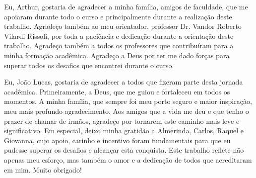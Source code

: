 \begin{agradecimentos}

    Eu, Arthur, gostaria de agradecer a minha família, amigos de faculdade, que me apoiaram durante todo o curso e principalmente durante a realização deste trabalho. Agradeço também ao meu orientador, professor Dr. Vandor Roberto Vilardi Rissoli, por toda a paciência e dedicação durante a orientação deste trabalho. Agradeço também a todos os professores que contribuíram para a minha formação acadêmica. Agradeço a Deus por ter me dado forças para superar todos os desafios que encontrei durante o curso.
    
    Eu, João Lucas, gostaria de agradecer a todos que fizeram parte desta jornada acadêmica. Primeiramente, a Deus, que me guiou e fortaleceu em todos os momentos. A minha família, que sempre foi meu porto seguro e maior inspiração, meu mais profundo agradecimento. Aos amigos que a vida me deu e que tenho o prazer de chamar de irmãos, agradeço por tornarem este caminho mais leve e significativo. Em especial, deixo minha gratidão a Almerinda, Carlos, Raquel e Giovanna, cujo apoio, carinho e incentivo foram fundamentais para que eu pudesse superar os desafios e alcançar esta conquista. Este trabalho reflete não apenas meu esforço, mas também o amor e a dedicação de todos que acreditaram em mim. Muito obrigado!

    
    \end{agradecimentos}